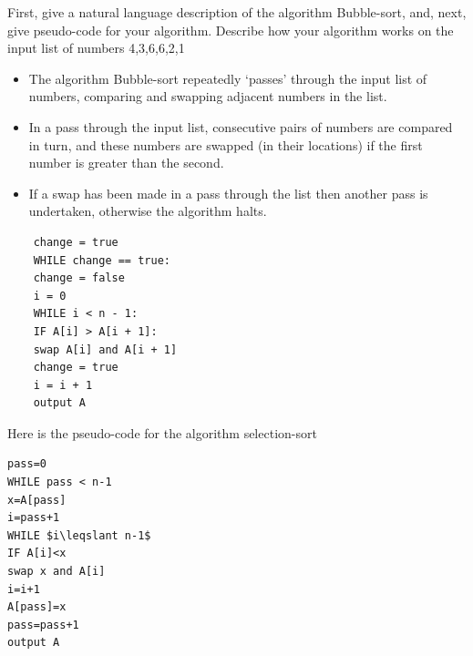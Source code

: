 \documentclass[addpoints]{exam}
\begin{document}
\begin{questions}
\question[10]First, give a natural language description of the algorithm Bubble-sort, and, next, give pseudo-code for your algorithm. Describe how your algorithm works on the input list of numbers 4,3,6,6,2,1
\begin{solution}[2in]
	\begin{itemize}
		\item The algorithm Bubble-sort repeatedly ‘passes’ through the input list of
		numbers, comparing and swapping adjacent numbers in the list.
		\item In a pass through the input list, consecutive pairs of numbers are compared
		in turn, and these numbers are swapped (in their locations) if
		the first number is greater than the second.
		\item If a swap has been made in a pass through the list then another pass
		is undertaken, otherwise the algorithm halts.
	\end{itemize}
	\begin{lstlisting}
	change = true
	WHILE change == true:
	change = false
	i = 0
	WHILE i < n - 1:
	IF A[i] > A[i + 1]:
	swap A[i] and A[i + 1]
	change = true
	i = i + 1
	output A
	\end{lstlisting}
\end{solution}
\question Here is the pseudo-code for the algorithm selection-sort
\begin{lstlisting}
pass=0
WHILE pass < n-1
x=A[pass]
i=pass+1
WHILE $i\leqslant n-1$
IF A[i]<x
swap x and A[i]
i=i+1
A[pass]=x
pass=pass+1
output A
\end{lstlisting}
\end{questions}
\end{document}
